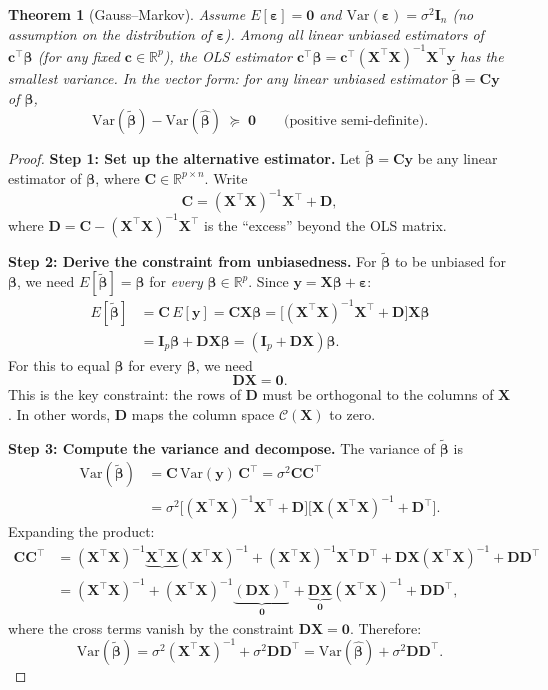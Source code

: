 \documentclass[11pt,a4paper]{article}
\theoremstyle{plain}
\newtheorem{theorem}{Theorem}[section]
\theoremstyle{definition}
\newcommand{\R}{\mathbb{R}}
\newcommand{\bhat}{\hat{\bm{\beta}}}
\newcommand{\btilde}{\tilde{\bm{\beta}}}
\newcommand{\bX}{\bm{X}}
\newcommand{\by}{\bm{y}}
\newcommand{\bI}{\bm{I}}
\newcommand{\bD}{\bm{D}}
\newcommand{\Col}{\mathcal{C}}
\begin{document}
\begin{theorem}[Gauss--Markov]\label{thm:gm}
Assume $E[\bm{\varepsilon}] = \bm{0}$ and
$\text{Var}(\bm{\varepsilon}) = \sigma^2\bI_n$
(no assumption on the distribution of $\bm{\varepsilon}$).
Among all linear unbiased estimators of $\bm{c}^\top\bm{\beta}$
(for any fixed $\bm{c}\in\R^p$), the OLS estimator
$\bm{c}^\top\bhat = \bm{c}^\top(\bX^\top\bX)^{-1}\bX^\top\by$
has the smallest variance.
In the vector form: for any linear unbiased estimator
$\btilde = \bm{C}\by$ of $\bm{\beta}$,
\[
  \text{Var}(\btilde) - \text{Var}(\bhat) \;\succeq\; \bm{0}
  \qquad\text{(positive semi-definite).}
\]
\end{theorem}

\begin{proof}
\textbf{Step 1: Set up the alternative estimator.}
Let $\btilde = \bm{C}\by$ be any linear estimator of $\bm{\beta}$, where
$\bm{C}\in\R^{p\times n}$.  Write
\[
  \bm{C} = (\bX^\top\bX)^{-1}\bX^\top + \bD,
\]
where $\bD = \bm{C} - (\bX^\top\bX)^{-1}\bX^\top$ is the ``excess'' beyond
the OLS matrix.

\medskip
\noindent\textbf{Step 2: Derive the constraint from unbiasedness.}
For $\btilde$ to be unbiased for $\bm{\beta}$, we need
$E[\btilde] = \bm{\beta}$ for \emph{every} $\bm{\beta}\in\R^p$.
Since $\by = \bX\bm{\beta} + \bm{\varepsilon}$:
\begin{align*}
  E[\btilde]
  &= \bm{C}\,E[\by]
   = \bm{C}\bX\bm{\beta}
   = \bigl[(\bX^\top\bX)^{-1}\bX^\top + \bD\bigr]\bX\bm{\beta} \\
  &= \bI_p\bm{\beta} + \bD\bX\bm{\beta}
   = (\bI_p + \bD\bX)\bm{\beta}.
\end{align*}
For this to equal $\bm{\beta}$ for every $\bm{\beta}$, we need
\begin{equation}\label{eq:gm-constraint}
  \boxed{\bD\bX = \bm{0}.}
\end{equation}
This is the key constraint: the rows of $\bD$ must be orthogonal to the
columns of $\bX$.  In other words, $\bD$ maps the column space $\Col(\bX)$
to zero.

\medskip
\noindent\textbf{Step 3: Compute the variance and decompose.}
The variance of $\btilde$ is
\begin{align*}
  \text{Var}(\btilde)
  &= \bm{C}\,\text{Var}(\by)\,\bm{C}^\top
   = \sigma^2\bm{C}\bm{C}^\top \\
  &= \sigma^2\bigl[(\bX^\top\bX)^{-1}\bX^\top + \bD\bigr]
              \bigl[\bX(\bX^\top\bX)^{-1} + \bD^\top\bigr].
\end{align*}
Expanding the product:
\begin{align*}
  \bm{C}\bm{C}^\top
  &= (\bX^\top\bX)^{-1}\underbrace{\bX^\top\bX}_{}(\bX^\top\bX)^{-1}
     + (\bX^\top\bX)^{-1}\bX^\top\bD^\top
     + \bD\bX(\bX^\top\bX)^{-1}
     + \bD\bD^\top \\
  &= (\bX^\top\bX)^{-1}
     + (\bX^\top\bX)^{-1}\underbrace{(\bD\bX)^\top}_{\bm{0}}
     + \underbrace{\bD\bX}_{\bm{0}}(\bX^\top\bX)^{-1}
     + \bD\bD^\top,
\end{align*}
where the cross terms vanish by the constraint $\bD\bX = \bm{0}$.
Therefore:
\[
  \text{Var}(\btilde)
  = \sigma^2(\bX^\top\bX)^{-1} + \sigma^2\bD\bD^\top
  = \text{Var}(\bhat) + \sigma^2\bD\bD^\top.
\]


\end{proof}
\end{document}
